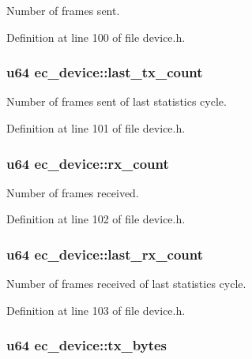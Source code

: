 Number of frames sent. 



Definition at line 100 of file device.\-h.

\subsubsection[{last\-\_\-tx\-\_\-count}]{\setlength{\rightskip}{0pt plus 5cm}u64 ec\-\_\-device\-::last\-\_\-tx\-\_\-count}\label{structec__device_afca221601cff7e6280283df48902a019}


Number of frames sent of last statistics cycle. 



Definition at line 101 of file device.\-h.

\subsubsection[{rx\-\_\-count}]{\setlength{\rightskip}{0pt plus 5cm}u64 ec\-\_\-device\-::rx\-\_\-count}\label{structec__device_ab53eaa1db2b7696c28f06146fd253786}


Number of frames received. 



Definition at line 102 of file device.\-h.

\subsubsection[{last\-\_\-rx\-\_\-count}]{\setlength{\rightskip}{0pt plus 5cm}u64 ec\-\_\-device\-::last\-\_\-rx\-\_\-count}\label{structec__device_a5ad25fde7d43696988dcb602fa947a7b}


Number of frames received of last statistics cycle. 



Definition at line 103 of file device.\-h.

\subsubsection[{tx\-\_\-bytes}]{\setlength{\rightskip}{0pt plus 5cm}u64 ec\-\_\-device\-::tx\-\_\-bytes}\label{structec__device_a969a3e6f0057eeb8b1becc34d500e281}


